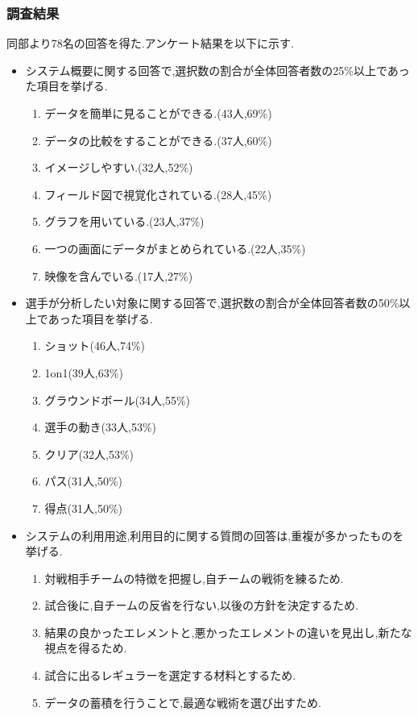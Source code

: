 \documentclass[sotsuron]{kuee}
\begin{document}
			\subsubsection{調査結果}
				同部より78名の回答を得た.アンケート結果を以下に示す.
				\begin{itemize}
				\item システム概要に関する回答で,選択数の割合が全体回答者数の25\%以上であった項目を挙げる.
					\begin{enumerate}
					\item データを簡単に見ることができる.(43人,69\%)
					\item データの比較をすることができる.(37人,60\%)
					\item イメージしやすい.(32人,52\%)
					\item フィールド図で視覚化されている.(28人,45\%)
					\item グラフを用いている.(23人,37\%)
					\item 一つの画面にデータがまとめられている.(22人,35\%)
					\item 映像を含んでいる.(17人,27\%)
					\end{enumerate}
				\item 選手が分析したい対象に関する回答で,選択数の割合が全体回答者数の50\%以上であった項目を挙げる.
					\begin{enumerate}
					\item ショット(46人,74\%)
					\item 1on1(39人,63\%)
					\item グラウンドボール(34人,55\%)
					\item 選手の動き(33人,53\%)
					\item クリア(32人,53\%)
					\item パス(31人,50\%)
					\item 得点(31人,50\%)
					\end{enumerate}
				\item システムの利用用途,利用目的に関する質問の回答は,重複が多かったものを挙げる.
					\begin{enumerate}
					\item 対戦相手チームの特徴を把握し,自チームの戦術を練るため.
					\item 試合後に,自チームの反省を行ない,以後の方針を決定するため.
					\item 結果の良かったエレメントと,悪かったエレメントの違いを見出し,新たな視点を得るため.
					\item 試合に出るレギュラーを選定する材料とするため.
					\item データの蓄積を行うことで,最適な戦術を選び出すため.
					\end{enumerate}
				\end{itemize}
\end{document}
